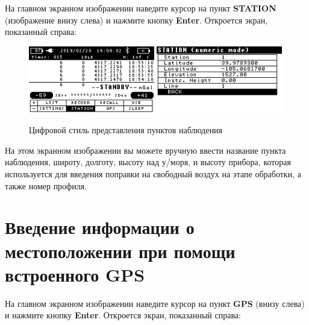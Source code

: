 На главном экранном изображении наведите курсор на пункт \textbf{STATION}
(изображение внизу слева) и нажмите кнопку \textbf{Enter}. Откроется экран,
показанный справа:

\begin{figure}[h]
  \centering
  \includegraphics[width=0.49\textwidth]{figures/station_screen_in_numeric_mode_1}
  \includegraphics[width=0.49\textwidth]{figures/station_screen_in_numeric_mode_2}
  \caption{Цифровой стиль представления пунктов наблюдения}
  \label{fig:station_screen_in_numeric_mode}
\end{figure}

На этом экранном изображении вы можете вручную ввести название пункта
наблюдения, широту, долготу, высоту над у/моря, и высоту прибора, которая
используется для введения поправки на свободный воздух на этапе обработки, а
также номер профиля.

\section[Введение местоположения]{Введение информации о местоположении при помощи встроенного GPS}


На главном экранном изображении наведите курсор на пункт \textbf{GPS} (внизу слева) и
нажмите кнопку \textbf{Enter}. Откроется экран, показанный справа:

